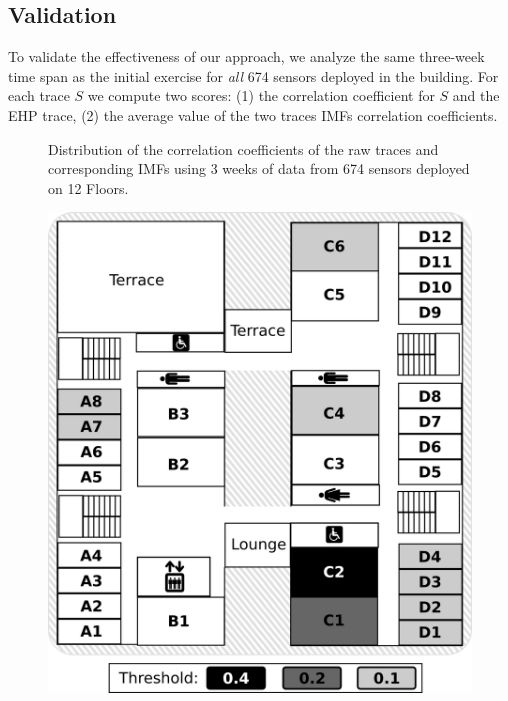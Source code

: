 \subsection{Validation}
To validate the effectiveness of our approach, we analyze the same three-week time span as the
initial exercise for \emph{all} 674 sensors deployed in the building.
For each trace $S$ we compute two scores: (1) the correlation coefficient for $S$ and the EHP trace, (2) the average value of the two traces IMFs correlation coefficients.

\begin{figure}[tbh!]
\centering
 \caption{Distribution of the correlation coefficients of the raw traces and corresponding IMFs using 3 weeks of data from 674 sensors deployed on 12 Floors.}
\label{fig:histo}
\end{figure}

\begin{figure}
\includegraphics[width=.5\textwidth]{img/floorMap.png}
\caption{}
\label{fig:map}
\end{figure}

